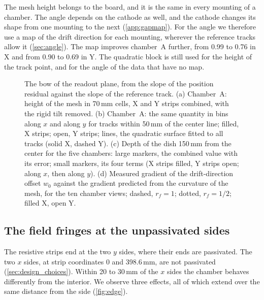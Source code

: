 The mesh height belongs to the board, and it is the same in every mounting of a chamber. The angle depends on the
cathode as well, and the cathode changes its shape from one mounting to the next (\cref{app:gapmap}). For the angle we
therefore use a map of the drift direction for each mounting, wherever the reference tracks allow it
(\cref{sec:angle}). The map improves chamber~A further, from 0.99 to 0.76\textdegree{} in X and from 0.90 to
0.69\textdegree{} in Y. The quadratic block is still used for the height of the track point, and for the angle of the data
that have no map.

\begin{figure}[tbp]
  \centering
  \caption{The bow of the readout plane, from the slope of the position residual against the slope of the reference
  track. (a) Chamber~A: height of the mesh in 70\,mm cells, X and Y strips combined, with the rigid tilt removed. (b)
  Chamber~A: the same quantity in bins along $x$ and along $y$ for tracks within 50\,mm of the center line; filled, X
  strips; open, Y strips; lines, the quadratic surface fitted to all tracks (solid X, dashed Y). (c) Depth of the dish
  150\,mm from the center for the five chambers: large markers, the combined value with its error; small markers, its
  four terms (X strips filled, Y strips open; along $x$, then along $y$). (d) Measured gradient of the drift-direction
  offset $w_0$ against the gradient predicted from the curvature of the mesh, for the ten chamber views; dashed,
  $r_f=1$; dotted, $r_f=1/2$; filled X, open Y.}
  \label{fig:bow}
\end{figure}

\subsection{The field fringes at the unpassivated sides}\label{sec:edge}
The resistive strips end at the two $y$ sides, where their ends are passivated. The two $x$ sides, at strip
coordinates 0 and 398.6\,mm, are not passivated (\cref{sec:design_choices}). Within 20 to 30\,mm of the $x$ sides the
chamber behaves differently from the interior. We observe three effects, all of which extend over the same distance
from the side (\cref{fig:edge}).

